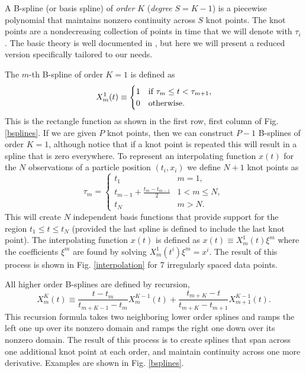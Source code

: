 \documentclass{ametsoc}
\begin{document}
A B-spline (or basis spline) of \emph{order} $K$ (\emph{degree} $S=K-1$) is a piecewise polynomial that maintains nonzero continuity across $S$ knot points. The knot points are a nondecreasing collection of points in time that we will denote with $\tau_i$. The basic theory is well documented in \citet{deboor1978-book}, but here we will present a reduced version specifically tailored to our needs.

The $m$-th B-spline of order $K=1$ is defined as
\begin{equation}
X^1_m(t) \equiv \begin{cases}
1      & \text{if $ \tau_m \leq t < \tau_{m+1}$}, \\
0     & \text{otherwise}.
\end{cases}
\end{equation}
This is the rectangle function as shown in the first row, first column of Fig. \ref{bsplines}. If we are given $P$ knot points, then we can construct $P-1$ B-splines of order $K=1$, although notice that if a knot point is repeated this will result in a spline that is zero everywhere. To represent an interpolating function $x(t)$ for the $N$ observations of a particle position $(t_i,x_i)$ we define $N+1$ knot points as
\begin{equation}
\tau_m = \begin{cases}
t_1      & \text{$m=1$}, \\
t_{m-1} + \frac{t_m-t_{m-1}}{2}	  & \text{$1<m \leq N$},\\
t_N     & \text{$m>N$}.
\end{cases}
\end{equation}
This will create $N$ independent basis functions that provide support for the region $t_1 \leq t \leq t_N$ (provided the last spline is defined to include the last knot point). The interpolating function $x(t)$ is defined as $x(t) \equiv  X^1_m(t) \xi^m$ where the coefficients $\xi^m$ are found by solving $X^1_m(t^i) \xi^m = x^i$. The result of this process is shown in Fig. \ref{interpolation} for 7 irregularly spaced data points.

All higher order B-splines are defined by recursion,
\begin{equation}
X^K_m(t) \equiv \frac{t - t_m}{t_{m+K-1} - t_m} X^{K-1}_m(t) + \frac{t_{m+K}-t}{t_{m+K} - t_{m+1}} X^{K-1}_{m+1}(t).
\end{equation}
This recursion formula takes two neighboring lower order splines and ramps the left one up over its nonzero domain and ramps the right one down over its nonzero domain. The result of this process is to create splines that span across one additional knot point at each order, and maintain continuity across one more derivative. Examples are shown in Fig. \ref{bsplines}.
\end{document}
